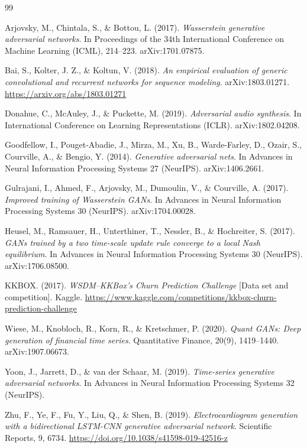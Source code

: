 \documentclass{article}
\begin{document}
\begin{thebibliography}{99}

Arjovsky, M., Chintala, S., \& Bottou, L. (2017).
\textit{Wasserstein generative adversarial networks}.
In Proceedings of the 34th International Conference on Machine Learning (ICML), 214--223. arXiv:1701.07875.

Bai, S., Kolter, J. Z., \& Koltun, V. (2018).
\textit{An empirical evaluation of generic convolutional and recurrent networks for sequence modeling}.
arXiv:1803.01271. \url{https://arxiv.org/abs/1803.01271}

Donahue, C., McAuley, J., \& Puckette, M. (2019).
\textit{Adversarial audio synthesis}.
In International Conference on Learning Representations (ICLR). arXiv:1802.04208.

Goodfellow, I., Pouget-Abadie, J., Mirza, M., Xu, B., Warde-Farley, D., Ozair, S., Courville, A., \& Bengio, Y. (2014).
\textit{Generative adversarial nets}.
In Advances in Neural Information Processing Systems 27 (NeurIPS). arXiv:1406.2661.

Gulrajani, I., Ahmed, F., Arjovsky, M., Dumoulin, V., \& Courville, A. (2017).
\textit{Improved training of Wasserstein GANs}.
In Advances in Neural Information Processing Systems 30 (NeurIPS). arXiv:1704.00028.

Heusel, M., Ramsauer, H., Unterthiner, T., Nessler, B., \& Hochreiter, S. (2017).
\textit{GANs trained by a two time-scale update rule converge to a local Nash equilibrium}.
In Advances in Neural Information Processing Systems 30 (NeurIPS). arXiv:1706.08500.

KKBOX. (2017).
\textit{WSDM--KKBox's Churn Prediction Challenge} [Data set and competition].
Kaggle. \url{https://www.kaggle.com/competitions/kkbox-churn-prediction-challenge}

Wiese, M., Knobloch, R., Korn, R., \& Kretschmer, P. (2020).
\textit{Quant GANs: Deep generation of financial time series}.
Quantitative Finance, 20(9), 1419--1440. arXiv:1907.06673.

Yoon, J., Jarrett, D., \& van der Schaar, M. (2019).
\textit{Time-series generative adversarial networks}.
In Advances in Neural Information Processing Systems 32 (NeurIPS).

Zhu, F., Ye, F., Fu, Y., Liu, Q., \& Shen, B. (2019).
\textit{Electrocardiogram generation with a bidirectional LSTM-CNN generative adversarial network}.
Scientific Reports, 9, 6734. \url{https://doi.org/10.1038/s41598-019-42516-z}

\end{thebibliography}
\end{document}
